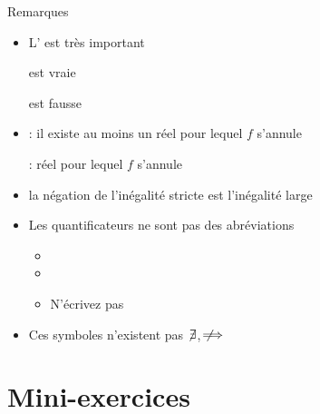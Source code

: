 \begin{frame}

Remarques
\begin{itemize}
  \item<1-> 
 L' est très important

\qquad {} \quad est vraie

\qquad {} \quad est fausse

  \item<2->  : il existe au moins un réel
pour lequel $f$ s'annule

 :  
réel pour lequel $f$ s'annule


  \item<3-> la négation de l'inégalité stricte \assertion{$<$} 
est l'inégalité large \assertion{$\ge$}

  \item<4-> Les quantificateurs ne sont pas des abréviations 
  \begin{itemize}
     \item {}
     \item {}
     \item N'écrivez pas 
  \end{itemize}


  \item<5-> Ces symboles n'existent pas $\not\!\exists$, $\not\!\!\!\implies$

\end{itemize} 
\end{frame}




\section{Mini-exercices}

